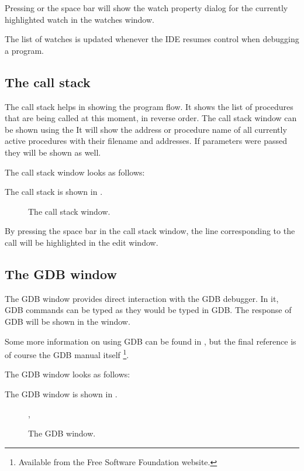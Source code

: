 Pressing  or the space bar will show the watch property dialog
for the currently highlighted watch in the watches window.

The list of watches is updated whenever the IDE resumes control when
debugging a program.
%
%
\subsection{The call stack}
\label{se:callstack}
The call stack helps in showing the program flow. It shows the list of
procedures that are being called at this moment, in reverse order.
The call stack window can be shown using the 
It will show the address or procedure name of all currently active 
procedures with their filename and addresses. If parameters were passed
they will be shown as well.
\begin{htmlonly}

The call stack window looks as follows:
\end{htmlonly}
\begin{latexonly}
The call stack is shown in .
\begin{figure}[ht]
\begin{center}
\caption{The call stack window.}\label{fig:callstack}
\ifpdf
{}
\else
{}
\fi
\end{center}
\end{figure}
\end{latexonly}

By pressing the space bar in the call stack window, the line corresponding
to the call will be highlighted in the edit window.

\subsection{The GDB window}
\label{se:gdbwindow}
The GDB window provides direct interaction with the GDB debugger.
In it, GDB commands can be typed as they would be typed in GDB.
The response of GDB will be shown in the window.

Some more information on using GDB can be found in , but
the final reference is of course the GDB manual itself
\footnote{Available from the Free Software Foundation website.}.

\begin{htmlonly}
The GDB window looks as follows:
\end{htmlonly}
\begin{latexonly}
The GDB window is shown in .
\begin{figure}[ht]
\begin{center}
\caption{The GDB window.}\label{fig:gdbwin}
\ifpdf
{}
\else
{},
\fi
\end{center}
\end{figure}
\end{latexonly}

